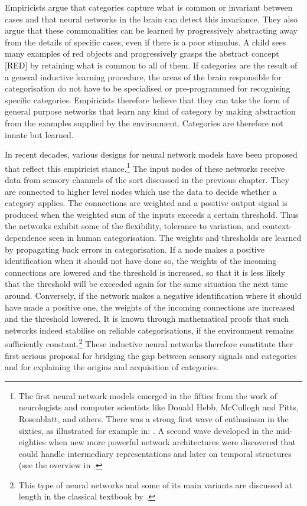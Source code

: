 Empiricists argue that categories 
capture what is common or invariant between cases and that
neural networks in the brain
can detect this invariance. They also argue
that these commonalities can be learned
by progressively abstracting away from the details of specific
cases, even if there is a poor stimulus. 
A child sees many examples of red objects and
progressively grasps the abstract concept [RED] 
by retaining what is common to all of them. 
If categories are the result of a general 
inductive learning procedure, the areas of the brain
responsible for categorisation do not have to be
specialised or pre-programmed for recognising 
specific categories. Empiricists therefore believe that 
they can take the 
form of general purpose networks that learn any kind 
of category by making abstraction from the examples 
supplied by the environment. Categories are therefore
not innate but learned. 

In recent decades, various designs for neural network models
have been proposed that reflect this empiricist stance.\footnote{
The first neural network models emerged in the 
fifties from the work of neurologists and computer 
scientists like Donald Hebb, McCullogh and Pitts, 
Rosenblatt, and others. There was a strong first wave of 
enthusiasm in the sixties, as illustrated for 
example in: \cite{Minsky:1968}. 
A second wave developed in the mid-eighties when 
new more powerful network architectures were discovered
that could handle intermediary representations and 
later on temporal structures (see the overview 
in \cite{Churchland:1992}. }
The input nodes of these networks receive data
from sensory channels of the sort discussed in the 
previous chapter. They are connected to higher
level nodes which use the data to decide whether
a category applies. The connections are weighted and 
a positive output signal is produced when 
the weighted sum of the inputs 
exceeds a certain threshold. Thus the networks
exhibit some of the flexibility, tolerance
to variation, and context-dependence seen in human
categorisation. The weights and thresholds are 
learned by propagating back errors in categorisation. 
If a node makes a positive identification when 
it should not have done so, the weights of the 
incoming connections are lowered and the threshold is
increased, so that it is less likely that the threshold
will be exceeded again for the same situation the next time around. 
Conversely, if the network makes a negative identification where
it should have made a positive one, the weights 
of the incoming connections are increased 
and the threshold lowered. It is known 
through mathematical proofs that such networks indeed
stabilise on reliable categorisations, if the 
environment remains sufficiently constant.\footnote{
This type of neural networks and some of its
main variants are discussed at length in the classical 
textbook by \cite{Rumelhart:1986}.}
These inductive neural networks therefore
constitute ther first serious proposal for bridging the gap between
sensory signals and categories and for explaining the 
origins and acquisition of categories. 

